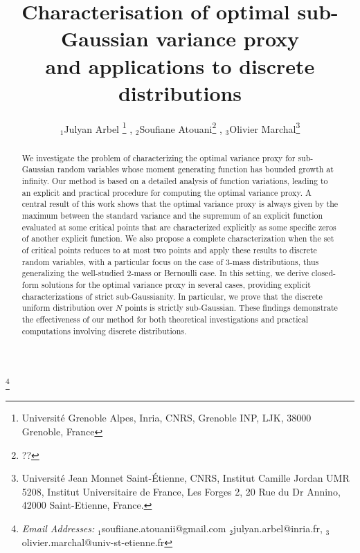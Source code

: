 \documentclass[a4paper, 10pt]{article}
\author{$_{1}$Julyan Arbel \footnote{Universit\'{e} Grenoble Alpes, Inria, CNRS, Grenoble INP, LJK, 38000 Grenoble, France}\,\,,
$_{2}$Soufiane Atouani\footnote{??}\,\,,
$_{3}$Olivier Marchal\footnote{Universit\'{e} Jean Monnet Saint-\'{E}tienne, CNRS, Institut Camille Jordan UMR 5208, Institut Universitaire de France, Les Forges 2, 20 Rue du Dr Annino, 42000 Saint-Etienne, France.}
}
\title{Characterisation of optimal sub-Gaussian variance proxy\\ and applications to discrete distributions}
\date{}
\renewcommand{\thefootnote}{\fnsymbol{footnote}}
\theoremstyle{definition}
\newcommand\blfootnote[1]{%
  \begingroup
  \renewcommand\thefootnote{}\footnote{#1}%
  \addtocounter{footnote}{-1}%
  \endgroup
}
\begin{document}
\maketitle

\blfootnote{\textit{Email Addresses:}
$_{1}$\textsf{soufiiane.atouanii@gmail.com}
$_{2}$\textsf{julyan.arbel@inria.fr},  
$_{3}$\textsf{olivier.marchal@univ-st-etienne.fr}}

\begin{abstract}
We investigate the problem of characterizing the optimal variance proxy for sub-Gaussian random variables whose moment generating function has bounded growth at infinity. Our method is based on a detailed analysis of function variations, leading  to an explicit and practical procedure for computing the optimal variance proxy. A central result of this work shows that the optimal variance proxy is always given by the maximum between the standard variance and the supremum of an explicit function evaluated at some critical points that are characterized explicitly as some specific zeros of another explicit function. We also propose a complete characterization when the set of critical points reduces to at most two points and apply these results to discrete random variables, with a particular focus on the case of 3-mass distributions, thus generalizing the well-studied 2-mass or Bernoulli case. In this setting, we derive closed-form solutions for the optimal variance proxy in several cases, providing explicit characterizations of strict sub-Gaussianity. In particular, we prove that the discrete uniform distribution over $N$ points is strictly sub-Gaussian. These findings demonstrate the effectiveness of our method for both theoretical investigations and practical computations involving discrete distributions.
\end{abstract}

\tableofcontents

\newpage
\end{document}
